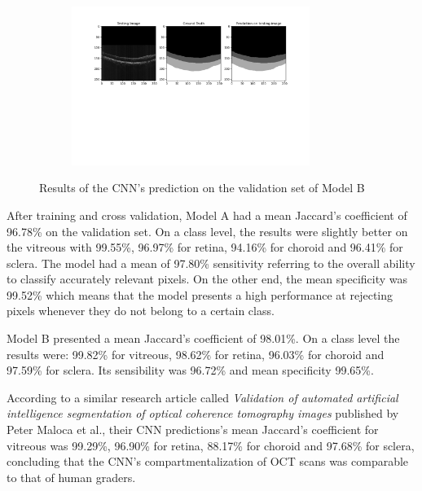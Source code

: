 \documentclass[12pt,a4paper]{scrartcl}
\begin{document}
\begin{figure}
\begin{subfigure}{1\textwidth}
    \includegraphics[trim= 100 250 80 0, clip, width=0.85\textwidth]{./images/results/B_syntethic_groundtruth_predictions29052021-081035.png}
    \caption{}
    \label{fig:results:B:c}
   \end{subfigure}
   \caption{Results of the CNN's prediction on the validation set of Model B}
  \label{fig:results_modelB}
\end{figure}

After training and cross validation, Model A had a mean Jaccard's coefficient of 96.78\% on the validation set. On a class level, the results were slightly better on the vitreous with 99.55\%, 96.97\% for retina, 94.16\% for choroid and 96.41\% for sclera.
The model had a mean of 97.80\% sensitivity referring to the overall ability to classify accurately relevant pixels. On the other end, the mean specificity was 99.52\% which means that the model presents a high performance at rejecting pixels whenever they do not belong to a certain class. 

Model B presented a mean Jaccard's coefficient of 98.01\%. On a class level the results were: 99.82\% for vitreous, 98.62\% for retina, 96.03\% for choroid and 97.59\% for sclera. Its sensibility was 96.72\% and mean specificity 99.65\%.

According to a similar research article called \emph{Validation of automated artificial intelligence segmentation of optical coherence tomography images}  published by Peter Maloca et al., their CNN predictions's mean Jaccard's coefficient for vitreous was 99.29\%, 96.90\% for retina, 88.17\% for choroid and 97.68\% for sclera, concluding that the CNN's compartmentalization of OCT scans was comparable to that of human graders. \cite{Maloca2019} 
\end{document}

